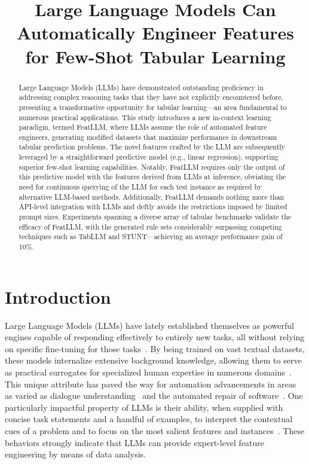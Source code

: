 \title{Large Language Models Can Automatically Engineer Features for Few-Shot Tabular Learning}

\begin{abstract}
Large Language Models (LLMs) have demonstrated outstanding proficiency in addressing complex reasoning tasks that they have not explicitly encountered before, presenting a transformative opportunity for tabular learning—an area fundamental to numerous practical applications. This study introduces a new in-context learning paradigm, termed \textsf{FeatLLM}, where LLMs assume the role of automated feature engineers, generating modified datasets that maximize performance in downstream tabular prediction problems. The novel features crafted by the LLM are subsequently leveraged by a straightforward predictive model (e.g., linear regression), supporting superior few-shot learning capabilities. Notably, \textsf{FeatLLM} requires only the output of this predictive model with the features derived from LLMs at inference, obviating the need for continuous querying of the LLM for each test instance as required by alternative LLM-based methods. Additionally, \textsf{FeatLLM} demands nothing more than API-level integration with LLMs and deftly avoids the restrictions imposed by limited prompt sizes. Experiments spanning a diverse array of tabular benchmarks validate the efficacy of \textsf{FeatLLM}, with the generated rule sets considerably surpassing competing techniques such as TabLLM and STUNT—achieving an average performance gain of 10\%.
\end{abstract}

\section{Introduction}
Large Language Models (LLMs) have lately established themselves as powerful engines capable of responding effectively to entirely new tasks, all without relying on specific fine-tuning for those tasks~\cite{creswell2022selection,imani2023mathprompter,taylor2022galactica}. By being trained on vast textual datasets, these models internalize extensive background knowledge, allowing them to serve as practical surrogates for specialized human expertise in numerous domains~\cite{Genomes2021,singhal2023large,wilcox2003role}. This unique attribute has paved the way for automation advancements in areas as varied as dialogue understanding~\cite{finch2023leveraging} and the automated repair of software~\cite{fan2023automated}. One particularly impactful property of LLMs is their ability, when supplied with concise task statements and a handful of examples, to interpret the contextual cues of a problem and to focus on the most salient features and instances~\cite{brown2020language,zhao2023survey}. These behaviors strongly indicate that LLMs can provide expert-level feature engineering by means of data analysis. 

